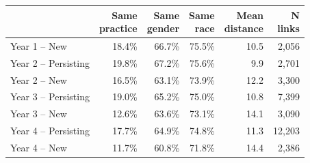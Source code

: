 
\begin{tabular}{lrrrrr}
\toprule
  & \shortstack[r]{Same \\ practice} & \shortstack[r]{Same \\ gender} & \shortstack[r]{Same \\ race} & \shortstack[r]{Mean \\ distance} & \shortstack[r]{N \\ links}\\
\midrule
Year 1 -- New & 18.4\% & 66.7\% & 75.5\% & 10.5 & 2,056\\
Year 2 -- Persisting & 19.8\% & 67.2\% & 75.6\% & 9.9 & 2,701\\
Year 2 -- New & 16.5\% & 63.1\% & 73.9\% & 12.2 & 3,300\\
Year 3 -- Persisting & 19.0\% & 65.2\% & 75.0\% & 10.8 & 7,399\\
Year 3 -- New & 12.6\% & 63.6\% & 73.1\% & 14.1 & 3,090\\
Year 4 -- Persisting & 17.7\% & 64.9\% & 74.8\% & 11.3 & 12,203\\
Year 4 -- New & 11.7\% & 60.8\% & 71.8\% & 14.4 & 2,386\\
\bottomrule
\end{tabular}
